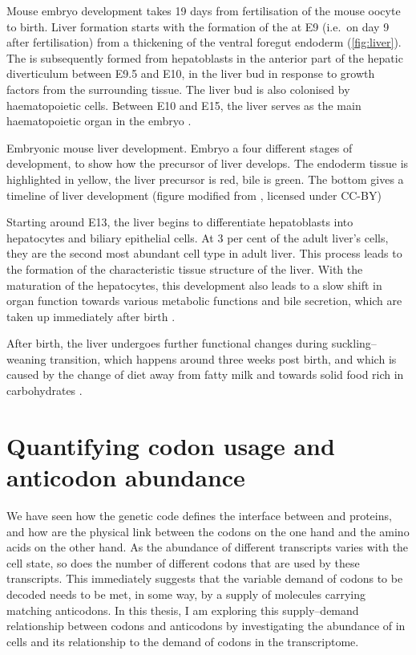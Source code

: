 Mouse embryo development takes \num{19} days from fertilisation of the mouse
oocyte to birth. Liver formation starts with the formation of the
 at E9 (i.e.\ on day \num{9} after fertilisation)
from a thickening of the ventral foregut endoderm (\cref{fig:liver}). The
 is subsequently formed from hepatoblasts in the anterior part
of the hepatic diverticulum between E9.5 and E10,  in the liver bud in response
to growth factors from the surrounding tissue. The liver bud is also colonised
by haematopoietic cells. Between E10 and E15, the liver serves as the main
haematopoietic organ in the embryo \citep{Zorn:2008}.

    {Embryonic mouse liver development.}
    {Embryo a four different stages of development, to show how the precursor of
    liver develops. The endoderm tissue is highlighted in yellow, the liver
    precursor is red, bile is green. The bottom gives a timeline of liver
    development (figure modified from \citet{Zorn:2008}, licensed under CC-BY)}

Starting around E13, the liver begins to differentiate hepatoblasts into
hepatocytes and biliary epithelial cells. At \num{3} per cent of the adult
liver’s cells, they are the second most abundant cell type in adult liver. This
process leads to the formation of the characteristic tissue structure of the
liver. With the maturation of the hepatocytes, this development also leads to a
slow shift in organ function towards various metabolic functions and bile
secretion, which are taken up immediately after birth \citep{Si-Tayeb:2010}.

After birth, the liver undergoes further functional changes during
suckling–weaning transition, which happens around three weeks post birth, and
which is caused by the change of diet away from fatty milk and towards solid
food rich in carbohydrates \citep{Girard:1992}.


\section{Quantifying codon usage and anticodon abundance}

We have seen how the genetic code defines the interface between \mrna and
proteins, and how \trna[s] are the physical link between the codons on the one
hand and the amino acids on the other hand. As the abundance of different \mrna
transcripts varies with the cell state, so does the number of different codons
that are used by these transcripts. This immediately suggests that the variable
demand of codons to be decoded needs to be met, in some way, by a supply of
\trna molecules carrying matching anticodons. In this thesis, I am exploring
this supply--demand relationship between codons and anticodons by investigating
the abundance of \trna[s] in cells and its relationship to the demand of codons
in the \mrna transcriptome.

